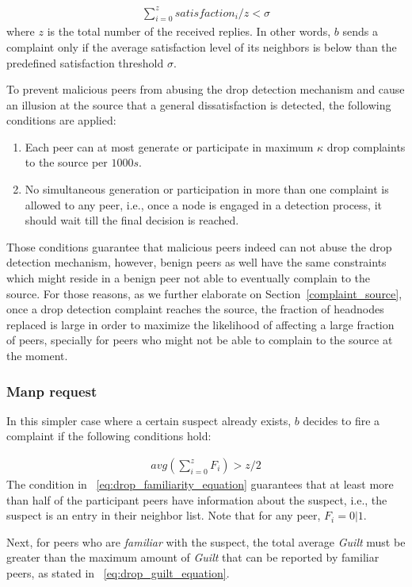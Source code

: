 \begin{align}
\label{eq:drop_satis_equation}
\sum_{i=0}^{z} satisfaction_i/z < \sigma
\end{align}
where $z$ is the total number of the received replies. 
In other words, $b$ sends a complaint only if the average satisfaction level of its neighbors is below than the predefined satisfaction threshold $\sigma$.

To prevent malicious peers from abusing the drop detection mechanism and cause an illusion at the source that a general dissatisfaction is detected, the following conditions are applied:
\begin{enumerate}
 \item Each peer can at most generate or participate in maximum $\kappa$ drop complaints to the source per $1000s$.
 \item No simultaneous generation or participation in more than one complaint is allowed to any peer, i.e., once a node is engaged in a detection process, it should wait till the final decision is reached.
\end{enumerate}
Those conditions guarantee that malicious peers indeed can not abuse the drop detection mechanism, however, benign peers as well have the same constraints which might reside in a benign peer not able to eventually complain to the source.
For those reasons, as we further elaborate on Section~\ref{complaint_source}, once a drop detection complaint reaches the source, the fraction of headnodes replaced is large in order to maximize the likelihood of affecting a large fraction of peers, specially for peers who might not be able to complain to the source at the moment.

\subsubsection*{Manp request}
In this simpler case where a certain suspect already exists, $b$ decides to fire a complaint if the following conditions hold:

\begin{align}
\label{eq:drop_familiarity_equation}
avg(\sum_{i=0}^{z} F_i) > z/2
\end{align}
The condition in ~\ref{eq:drop_familiarity_equation} guarantees that at least more than half of the participant peers have information about the suspect, i.e., the suspect is an entry in their neighbor list.
Note that for any peer, $F_i = 0 | 1$.

Next, for peers who are \textit{familiar} with the suspect, the total average \textit{Guilt} must be greater than the maximum amount of \textit{Guilt} that can be reported by familiar peers, as stated in ~\ref{eq:drop_guilt_equation}.

